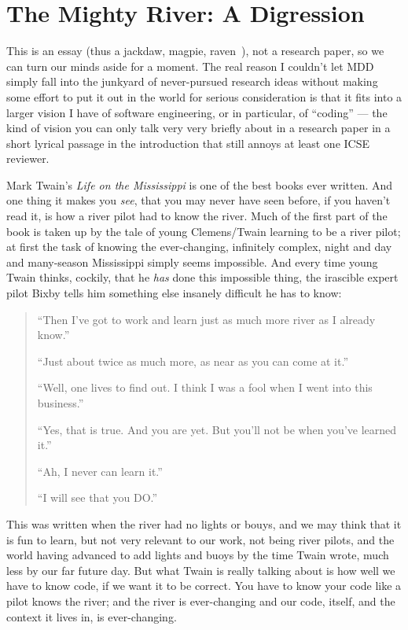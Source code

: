 \documentclass[sigplan,screen]{acmart}
\begin{document}
\section{The Mighty River: A Digression}

This is an essay (thus a jackdaw, magpie, raven~\cite{doyleessay}), not a research paper, so we can turn our minds aside
for a moment.  The real reason I couldn't let MDD simply fall into the
junkyard of never-pursued research ideas without making some effort to put it
out in the world for serious consideration is that it fits into a
larger vision I have of software engineering, or in particular, of
``coding'' --- the kind of vision you
can only talk very very briefly about in a research paper in a short lyrical passage in the
introduction that still annoys at least one ICSE reviewer.

Mark Twain's \emph{Life on the Mississippi} is one of the best books
ever written.  And one thing it makes you \emph{see}, that you may
never have seen before, if you haven't read it, is how a river pilot
had to know the river.  Much of the first part of the book is taken up
by the tale of young Clemens/Twain learning to be a river pilot; at
first the task of knowing the ever-changing, infinitely complex, night
and day and many-season Mississippi simply seems impossible.  And
every time young Twain thinks, cockily, that he \emph{has} done this
impossible thing, the irascible expert pilot Bixby tells him something
else insanely difficult he has to know:

\begin{quote}
``Then I've got to work and learn just as much more river as I already
know.''

``Just about twice as much more, as near as you can come at it.''

``Well, one lives to find out.  I think I was a fool when I went into
this business.''

``Yes, that is true.  And you are yet.  But you'll not be when you've
learned it.''

``Ah, I never can learn it.''

``I will see that you DO.''
\end{quote}

This was written when the river had no lights or bouys, and we may
think that it is fun to learn, but not very relevant to  our work, not
being river pilots, and the world having advanced to add lights and
buoys by the time Twain wrote, much less by our far future day.  But
what Twain is really talking about is how well we have to know code,
if we want it to be correct.  You have to know your code like a pilot
knows the river; and the river is ever-changing and our code, itself,
and the context it lives in, is ever-changing.
\end{document}
